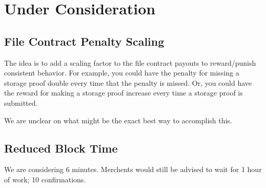 \documentclass[twocolumn]{article}
\begin{document}


\section{Under Consideration}
\subsection{File Contract Penalty Scaling}
The idea is to add a scaling factor to the file contract payouts to reward/punish consistent behavior.
For example, you could have the penalty for missing a storage proof double every time that the penalty is missed.
Or, you could have the reward for making a storage proof increase every time a storage proof is submitted.

We are unclear on what might be the exact best way to accomplish this.

\subsection{Reduced Block Time}
We are considering 6 minutes.
Merchents would still be advised to wait for 1 hour of work; 10 confirmations.
\end{document}
